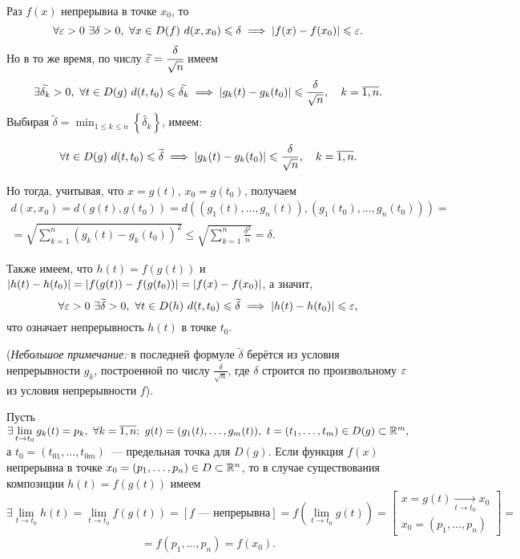 \documentclass[../../main.tex]{subfiles}
\begin{document}
	\begin{eans}
		Раз $f(x)$ непрерывна в точке $x_0$, то
		\[
		\forall \varepsilon > 0\ \exists \delta > 0,\ \forall x\in D(f)\ d(x, x_0)\leqslant 
		\delta\implies \left|{f(x) - f(x_0)}\right|\leqslant \varepsilon.
		\]
		Но в то же время, по числу $\widetilde{\varepsilon} = \cfrac{\delta}{\sqrt{n}}$ 
		имеем
		\[\exists \widetilde{\delta_k} > 0,\ \forall t\in D(g)\ d(t, 
		t_0)\leqslant\widetilde{\delta_k}\implies \left|{g_k(t) - g_k(t_0)}\right|\leqslant 
		\frac{\delta}{\sqrt{n}},\quad k = \overline{1, n}.\]
		Выбирая $\widetilde{\delta} = \min_{1\leq k\leq 
		n}\left\{\widetilde{\delta_k}\right\}$, имеем:
		
		\[\forall t\in D(g)\ d(t, t_0)\leqslant\widetilde{\delta}\implies \left|{g_k(t) - 
		g_k(t_0)}\right|\leqslant \frac{\delta}{\sqrt{n}},\quad k = \overline{1, n}.\]
		
		Но тогда, учитывая, что $x = g(t)$, $x_0 = g(t_0)$, получаем
		\begin{gather*}
			d(x, x_0) = d(g(t), g(t_0)) = d\left((g_1(t),\ldots,g_n(t)), 
			(g_1(t_0),\ldots,g_n(t_0))\right) = \\
			= \sqrt{\sum_{k = 1}^n\left(g_k(t) - g_k(t_0)\right)^2}\leq \sqrt{\sum_{k = 
			1}^n\frac{\delta^2}{n}} = \delta.
		\end{gather*}
		
		Также имеем, что $h(t) = f(g(t))$ и $\left|{h(t) - h(t_0)}\right| = \left|{f(g(t)) - 
		f(g(t_0))}\right| = \left|{f(x) - f(x_0)}\right|$, а значит,
		\[\forall \varepsilon > 0\ \exists \widetilde{\delta} > 0,\ \forall t\in D(h)\ d(t, 
		t_0)\leqslant \widetilde{\delta}\implies \left|{h(t) - h(t_0)}\right|\leqslant \varepsilon,\]
		что означает непрерывность $h(t)$ в точке $t_0$.
		
		(\emph{Небольшое примечание:} в последней формуле $\widetilde{\delta}$ 
		берётся из условия непрерывности $g_k$, построенной по числу 
		$\frac{\delta}{\sqrt{n}}$, где $\delta$ строится по произвольному $\varepsilon$ из 
		условия непрерывности $f$).
	\end{eans}
    \begin{crl*}
    	Пусть $\exists \lim\limits_{t \to t_0}g_k(t) = p_k, \ 
    	\forall k = \overline{1, n}; \  g(t) = (g_1(t), 
    	\ldots, g_m(t)),\ t = (t_1,
    	 \ldots, t_m) \in D(g) \subset \R^m,$ а $t_0 = 
    	 (t_{01}, \ldots, t_{0m})$~---
    	предельная точка для $D(g)$. Если функция $f(x)$ непрерывна в точке 
    	$x_0 = (p_1, \ldots, p_n) \in D \subset \mathbb{R}^n$, то в случае 
    	существования композиции $h(t) = f(g(t))$ имеем
    	\[
    	    \exists \lim\limits_{t \to t_0}h(t) = \lim\limits_{t \to t_0}f(g(t)) =
    		\left[f\text{~--- непрерывна}\right] = f(\lim\limits_{t \to t_0}g(t)) = 
    		\left[
    		\begin{array}{l}
    			x = g(t) \underset{t \to t_0}{\to} x_0 \\
    			x_0 = (p_1, \ldots, p_n) 
    		\end{array}
    		\right] = 
    	\]
    	\[
    		= f(p_1, \ldots, p_n) = f(x_0).
    	\]
    \end{crl*}
\end{document}
